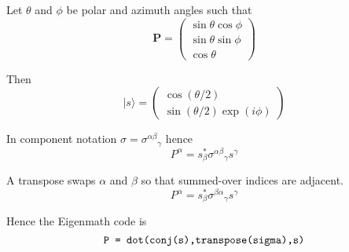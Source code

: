\documentclass[12pt]{article}
\begin{document}
Let $\theta$ and $\phi$ be polar and azimuth angles such that
\begin{equation*}
\mathbf P=\begin{pmatrix}\sin\theta\cos\phi\\\sin\theta\sin\phi\\\cos\theta\end{pmatrix}
\end{equation*}

Then
\begin{equation*}
|s\rangle=\begin{pmatrix}\cos(\theta/2)\\\sin(\theta/2)\exp(i\phi)\end{pmatrix}
\end{equation*}

In component notation $\sigma=\sigma^{\alpha\beta}{}_\gamma$ hence
\begin{equation*}
P^\alpha=s_\beta^*\sigma^{\alpha\beta}{}_\gamma s^\gamma
\end{equation*}

A transpose swaps $\alpha$ and $\beta$ so that summed-over indices are adjacent.
\begin{equation*}
P^\alpha=s_\beta^*\sigma^{\beta\alpha}{}_\gamma s^\gamma
\end{equation*}

Hence the Eigenmath code is
\begin{equation*}
\text{\tt P = dot(conj(s),transpose(sigma),s)}
\end{equation*}
\end{document}
